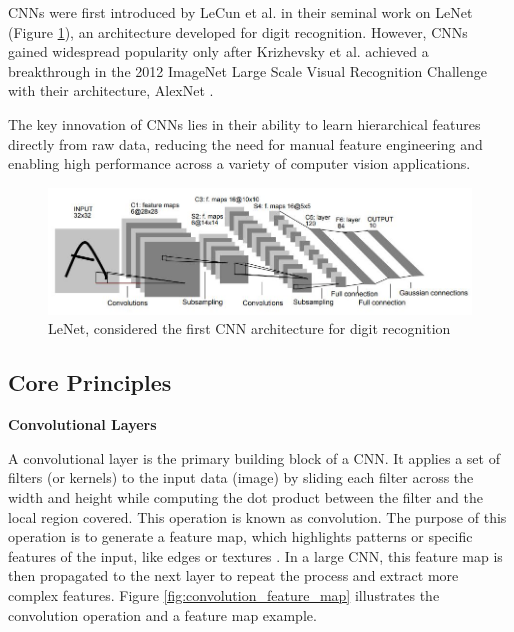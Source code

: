 \documentclass[a4paper,10pt]{book}
\begin{document}
CNNs were first introduced by LeCun et al. \cite{lecun_gradient-based_1998} in their seminal work on LeNet (Figure \ref{fig:lenet}), an architecture developed for digit recognition. However, CNNs gained widespread popularity only after Krizhevsky et al. achieved a breakthrough in the 2012 ImageNet Large Scale Visual Recognition Challenge with their architecture, AlexNet \cite{NIPS2012_c399862d}.

The key innovation of CNNs lies in their ability to learn hierarchical features directly from raw data, reducing the need for manual feature engineering and enabling high performance across a variety of computer vision applications.


\begin{figure}[h!]
    \centering
    \includegraphics[width=0.8\linewidth]{reports//assets/lenet.jpg}
    \caption[LeNet CNN]{LeNet, considered the first CNN architecture for digit recognition}
    \label{fig:lenet}
\end{figure}


\subsection{Core Principles}

\textbf{Convolutional Layers}

A convolutional layer is the primary building block of a CNN. It applies a set of filters (or kernels) to the input data (image) by sliding each filter across the width and height while computing the dot product between the filter and the local region covered. This operation is known as convolution. The purpose of this operation is to generate a feature map, which highlights patterns or specific features of the input, like edges or textures \cite{noauthor_what_2021}. In a large CNN, this feature map is then propagated to the next layer to repeat the process and extract more complex features. Figure \ref{fig:convolution_feature_map} illustrates the convolution operation and a feature map example.
\end{document}
